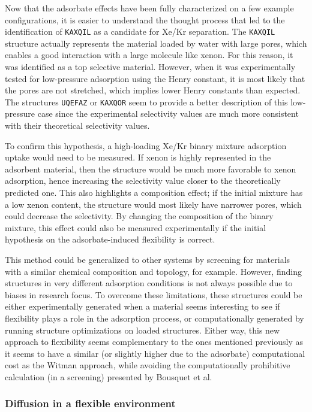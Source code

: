 \documentclass[main]{subfiles}
\begin{document}
Now that the adsorbate effects have been fully characterized on a few example configurations, it is easier to understand the thought process that led to the identification of \texttt{KAXQIL} as a candidate for Xe/Kr separation. The \texttt{KAXQIL} structure actually represents the material loaded by water with large pores, which enables a good interaction with a large molecule like xenon. For this reason, it was identified as a top selective material. However, when it was experimentally tested for low-pressure adsorption using the Henry constant, it is most likely that the pores are not stretched, which implies lower Henry constants than expected. The structures \texttt{UQEFAZ} or \texttt{KAXQOR} seem to provide a better description of this low-pressure case since the experimental selectivity values are much more consistent with their theoretical selectivity values. 

To confirm this hypothesis, a high-loading Xe/Kr binary mixture adsorption uptake would need to be measured. If xenon is highly represented in the adsorbent material, then the structure would be much more favorable to xenon adsorption, hence increasing the selectivity value closer to the theoretically predicted one. This also highlights a composition effect; if the initial mixture has a low xenon content, the structure would most likely have narrower pores, which could decrease the selectivity. By changing the composition of the binary mixture, this effect could also be measured experimentally if the initial hypothesis on the adsorbate-induced flexibility is correct.

This method could be generalized to other systems by screening for materials with a similar chemical composition and topology, for example. However, finding structures in very different adsorption conditions is not always possible due to biases in research focus. To overcome these limitations, these structures could be either experimentally generated when a material seems interesting to see if flexibility plays a role in the adsorption process, or computationally generated by running structure optimizations on loaded structures. Either way, this new approach to flexibility seems complementary to the ones mentioned previously as it seems to have a similar (or slightly higher due to the adsorbate) computational cost as the Witman approach, while avoiding the computationally prohibitive calculation (in a screening) presented by Bousquet et al.\autocite{Bousquet2012} 


\subsubsection{Diffusion in a flexible environment}
\end{document}
